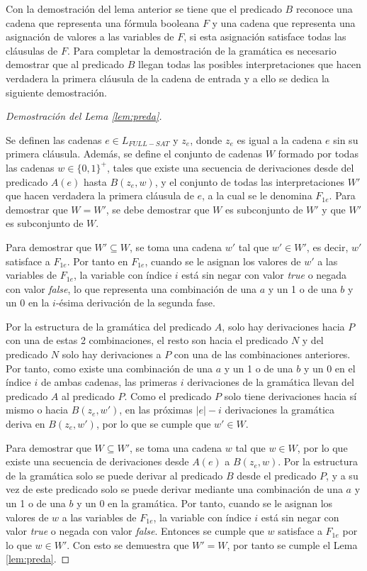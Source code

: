 \documentclass{article}
\newcommand{\true}{\textit{true}}
\newcommand{\false}{\textit{false}}
\begin{document}
Con la demostración del lema anterior se tiene que el predicado $B$ reconoce una cadena que representa una fórmula booleana $F$
y una cadena que representa una asignación de valores a las variables de $F$, si esta asignación satisface
todas las cláusulas de $F$. Para completar la demostración de la gramática es necesario demostrar
que al predicado $B$ llegan todas las posibles interpretaciones que hacen verdadera la primera cláusula
de la cadena de entrada y a ello se dedica la siguiente demostración.

\begin{proof}[Demostración del Lema \ref{lem:preda}] \

    Se definen las cadenas $e\in L_{FULL-SAT}$ y $z_e$, donde $z_e$ es igual a la cadena $e$ sin su primera cláusula.
    Además, se define el conjunto de cadenas $W$ formado por todas las cadenas $w\in \{0,1\}^+$, tales que existe una secuencia de derivaciones desde del predicado $A(e)$ hasta $B(z_e,w)$,
    y el conjunto de todas las interpretaciones $W'$ que hacen verdadera la primera cláusula de $e$, a la cual se le denomina $F_{1e}$.
    Para demostrar que $W=W'$, se debe demostrar que $W$ es subconjunto de $W'$ y que $W'$ es subconjunto de $W$.

    Para demostrar que $W'\subseteq W$, se toma una cadena $w'$ tal que $w'\in W'$, es decir, $w'$ satisface a $F_{1e}$.  Por tanto en $F_{1e}$, cuando se le asignan los valores de $w'$ a las variables de $F_{1e}$, la variable  con índice $i$ está sin negar con valor \true{} o negada con valor \false{}, lo que representa una combinación de una $a$ y un 1 o de una $b$ y un 0 en la $i$-ésima derivación de la segunda fase.

    Por la estructura de la gramática del predicado $A$, solo hay derivaciones hacia $P$ con una de estas 2 combinaciones, el resto son hacia el predicado $N$ y del predicado $N$ solo hay derivaciones a $P$ con una de las combinaciones anteriores. Por tanto, como existe una combinación de una $a$ y un 1 o de una $b$ y un 0 en el índice $i$ de ambas cadenas, las primeras $i$ derivaciones de la gramática llevan del predicado $A$ al predicado $P$. Como el predicado $P$ solo tiene derivaciones hacia sí mismo o hacia $B(z_e,w')$, en las próximas $|e|-i$ derivaciones la gramática deriva en $B(z_e,w')$, por lo que se cumple que $w'\in W$.

    Para demostrar que $W\subseteq W'$, se toma una cadena $w$ tal que $w\in W$, por lo que existe una secuencia de derivaciones desde $A(e)$ a $B(z_e,w)$. Por la estructura de la gramática solo se puede derivar al predicado $B$ desde el predicado $P$, y a su vez de este predicado solo se puede derivar mediante una combinación de una $a$ y un 1 o de una $b$ y un 0 en la gramática. Por tanto, cuando se le asignan los valores de $w$ a las variables de $F_{1e}$, la variable con índice $i$ está sin negar con valor \true{} o negada con valor \false{}.  Entonces se cumple que $w$ satisface a $F_{1e}$ por lo que $w\in W'$. Con esto se demuestra que $W'=W$, por tanto se cumple el Lema \ref{lem:preda}.
\end{proof}
\end{document}
